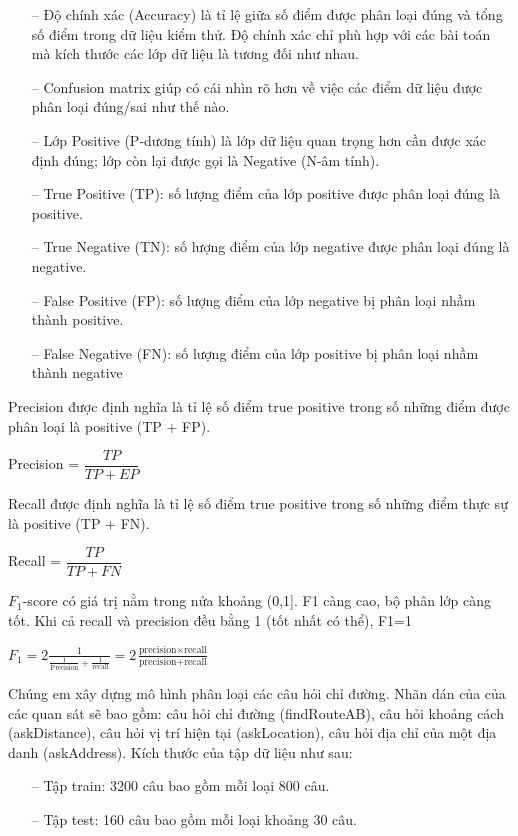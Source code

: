 \begin{itemize}
    \item[--] Độ chính xác (Accuracy) là tỉ lệ giữa số điểm được phân loại đúng và tổng số điểm trong dữ liệu kiểm thử. Độ chính xác chỉ phù hợp với các bài toán mà kích thước các lớp dữ liệu là tương đối như nhau.
    \item[--] Confusion matrix giúp có cái nhìn rõ hơn về việc các điểm dữ liệu được phân loại đúng/sai như thế nào.
    \item[--] Lớp Positive (P-dương tính) là lớp dữ liệu quan trọng hơn cần được xác định đúng; lớp còn lại được gọi là Negative (N-âm tính).
    \item[--] True Positive (TP): số lượng điểm của lớp positive được phân loại đúng là positive.
    \item[--] True Negative (TN): số lượng điểm của lớp negative được phân loại đúng là negative.
    \item[--] False Positive (FP): số lượng điểm của lớp negative bị phân loại nhầm thành positive.
    \item[--] False Negative (FN): số lượng điểm của lớp positive bị phân loại nhầm thành negative
\end{itemize}

Precision được định nghĩa là tỉ lệ số điểm true positive trong số những điểm được phân loại là positive (TP + FP).
\begin{center}
    Precision = $\dfrac{TP}{TP+EP}$
\end{center}

Recall được định nghĩa là tỉ lệ số điểm true positive trong số những điểm thực sự là positive (TP + FN).
\begin{center}
    Recall = $\dfrac{TP}{TP+FN}$
\end{center}

$F_{1}$-score có giá trị nằm trong nửa khoảng (0,1]. F1 càng cao, bộ phân lớp càng tốt. Khi cả recall và precision đều bằng 1 (tốt nhất có thể), F1=1
\begin{center}
    $F_{1}=2\frac{1}{\frac{1}{\text{Precision}} + \frac{1}{\text{recall}}}= 2\frac{\text{precision} \times \text{recall}}{\text{precision} + \text{recall}}$
\end{center}

Chúng em xây dựng mô hình phân loại các câu hỏi chỉ đường. Nhãn dán của của các quan sát sẽ bao gồm: câu hỏi chỉ đường (findRouteAB), câu hỏi khoảng cách (askDistance), câu hỏi vị trí hiện tại (askLocation), câu hỏi địa chỉ của một địa danh (askAddress). Kích thước của tập dữ liệu như sau:
\begin{itemize}
    \item[--] Tập train: 3200 câu bao gồm mỗi loại 800 câu.
    \item[--] Tập test: 160 câu bao gồm mỗi loại khoảng 30 câu.
\end{itemize}

